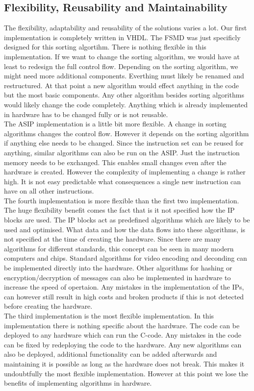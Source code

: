 \documentclass[conference]{IEEEtran}
\begin{document}
\subsection{Flexibility, Reusability and Maintainability}
The flexibility, adaptability and reusability of the solutions varies a lot. Our first implementation is completely written in VHDL. The FSMD was just specificly designed for this sorting algortihm. There is nothing flexible in this implementation. If we want to change the sorting algorithm, we would have at least to redesign the full control flow. Depending on the sorting algorithm, we might need more additional components. Everthing must likely be renamed and restructured. At that point a new algorithm would effect anything in the code but the most basic components. Any other algorithm besides sorting algorithms would likely change the code completely. Anything which is already implemented in hardware has to be changed fully or is not reusable. \\
The ASIP implementation is a little bit more flexible. A change in sorting algorithms changes the control flow. However it depends on the sorting algorithm if anything else needs to be changed. Since the instruction set can be reused for anything, similar algorithms can also be run on the ASIP. Just the instruction memory needs to be exchanged. This enables small changes even after the hardware is created. However the complexity of implementing a change is rather high. It is not easy predictable what consequences a single new instruction can have on all other instructions. \\
The fourth implementation is more flexible than the first two implementation. The huge flexibility benefit comes the fact that is it not specified how the IP blocks are used. The IP blocks act as predefined algorithms which are likely to be used and optimised. What data and how the data flows into these algorithms, is not specified at the time of creating the hardware. Since there are many algorithms for different standards, this concept can be seen in many modern computers and chips. Standard algorithms for video encoding and deconding can be implemented directly into the hardware. Other algorithms for hashing or encryption/decryption of messages can also be implemented in hardware to increase the speed of opertaion. Any mistakes in the implementation of the IPs, can however still result in high costs and broken products if this is not detected before creating the hardware. \\
The third implementation is the most flexible implementation. In this implementation there is nothing specific about the hardware. The code can be deployed to any hardware which can run the C-code. Any mistakes in the code can be fixed by redeploying the code to the hardware. Any new algorithms can also be deployed, additional functionality can be added afterwards and maintaining it is possible as long as the hardware does not break. This makes it undoubtfully the most flexible implementation. However at this point we lose the benefits of implementing algorithms in hardware. \\
\end{document}
